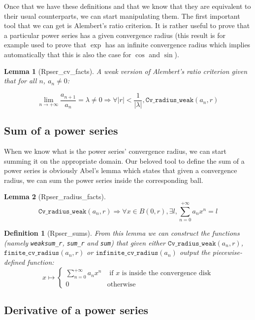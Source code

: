 \documentclass[submission,copyright]{eptcs}
\newcommand{\cvrw}{\texttt{Cv\_radius\_weak}}
\newcommand{\fcvr}{\texttt{finite\_cv\_radius}}
\newcommand{\icvr}{\texttt{infinite\_cv\_radius}}
\newtheorem{definition}{Definition}
\newtheorem{lemma}{Lemma}
\begin{document}
Once that we have these definitions and that we know that they are
equivalent to their usual counterparts, we can start manipulating them.
The first important tool that we can get is Alembert's ratio criterion.
It is rather useful to prove that a particular power series has a given
convergence radius (this result is for example used to prove that $\exp$
has an infinite convergence radius which implies automatically that this
is also the case for $\cos$ and $\sin$).

\begin{lemma}[Rpser\_cv\_facts] A weak version of Alembert's ratio
criterion given that for all $n$, $a_n \neq 0$:

$$\lim\limits_{n \to + \infty}\frac{a_{n+1}}{a_n} = \lambda \neq 0
  \Rightarrow \forall \left| r \right| < \frac{1}{\left| \lambda \right|
  }, \cvrw{}(a_n,r)$$
\end{lemma}

\subsection{Sum of a power series}

When we know what is the power series' convergence radius, we can start
summing it on the appropriate domain. Our beloved tool to define the sum
of a power series is obviously Abel's lemma which states that given a
convergence radius, we can sum the power series inside the corresponding
ball.

\begin{lemma}[Rpser\_radius\_facts] $$\cvrw{}(a_n,r) \Rightarrow
\forall x \in B(0,r), \exists l, \sum_{n=0}^{+\infty} a_n x^n = l$$
\end{lemma}

\begin{definition}[Rpser\_sums] From this lemma we can construct the functions
(namely \texttt{weaksum\_r}, \texttt{sum\_r} and \texttt{sum}) that given either
$\cvrw{}(a_n,r)$, $\fcvr{}(a_n,r)$ or $\icvr{}(a_n)$ output the piecewise-defined
function: $$x \mapsto \left\lbrace
\begin{array}{ll}
\sum_{n=0}^{+\infty} a_n x^n & \text{ if } x \text{ is inside the convergence
disk}\\
0 & \text{otherwise}
\end{array}\right.$$
\end{definition}

\subsection{Derivative of a power series}
\end{document}

